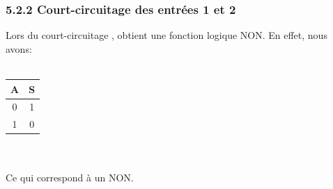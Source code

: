 \documentclass{report}
\begin{document}
\subsubsection*{5.2.2 Court-circuitage des entr\'ees 1 et 2}
\hspace*{1,5cm} Lors du court-circuitage , obtient une fonction logique NON. En effet, nous avons:\\
\\
\begin{tabular}{|c|c|}
\hline
A&S  \\
\hline
0&1\\
1&0\\
\hline
\end{tabular}\\
\\
\hspace*{1,5cm} Ce qui correspond \`a un NON.
\end{document}
